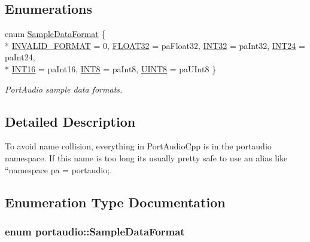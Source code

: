 \subsection*{Enumerations}
\begin{DoxyCompactItemize}
\item 
enum \hyperlink{namespaceportaudio_a30bc71f065706d41a5d9208ea861e4a6}{Sample\+Data\+Format} \{ \\*
\hyperlink{namespaceportaudio_a30bc71f065706d41a5d9208ea861e4a6a57d1e6b20da033bdce2715fc64b43951}{I\+N\+V\+A\+L\+I\+D\+\_\+\+F\+O\+R\+M\+AT} = 0, 
\hyperlink{namespaceportaudio_a30bc71f065706d41a5d9208ea861e4a6af45836039af9ec732cd18c40d0df8fb3}{F\+L\+O\+A\+T32} = pa\+Float32, 
\hyperlink{namespaceportaudio_a30bc71f065706d41a5d9208ea861e4a6a6dd61123fe207d74b9af1bc56ade8108}{I\+N\+T32} = pa\+Int32, 
\hyperlink{namespaceportaudio_a30bc71f065706d41a5d9208ea861e4a6a6bfffdaf68a303c98d95f201dbbdfecf}{I\+N\+T24} = pa\+Int24, 
\\*
\hyperlink{namespaceportaudio_a30bc71f065706d41a5d9208ea861e4a6a310dc523199cfdf17a31b6e5fc412586}{I\+N\+T16} = pa\+Int16, 
\hyperlink{namespaceportaudio_a30bc71f065706d41a5d9208ea861e4a6ae713fcdbc839b7d2929c89291a97d359}{I\+N\+T8} = pa\+Int8, 
\hyperlink{namespaceportaudio_a30bc71f065706d41a5d9208ea861e4a6a19aab90c0fe25078edabfa2530fcac16}{U\+I\+N\+T8} = pa\+U\+Int8
 \}\begin{DoxyCompactList}\small\item\em Port\+Audio sample data formats. \end{DoxyCompactList}
\end{DoxyCompactItemize}


\subsection{Detailed Description}
To avoid name collision, everything in Port\+Audio\+Cpp is in the portaudio namespace. If this name is too long it\textquotesingle{}s usually pretty safe to use an alias like ``namespace pa = portaudio;\textquotesingle{}\textquotesingle{}. 

\subsection{Enumeration Type Documentation}
\subsubsection[{\texorpdfstring{Sample\+Data\+Format}{SampleDataFormat}}]{\setlength{\rightskip}{0pt plus 5cm}enum {\bf portaudio\+::\+Sample\+Data\+Format}}\hypertarget{namespaceportaudio_a30bc71f065706d41a5d9208ea861e4a6}{}\label{namespaceportaudio_a30bc71f065706d41a5d9208ea861e4a6}



